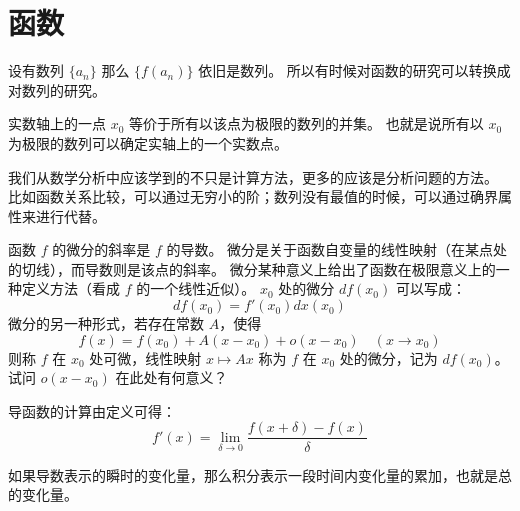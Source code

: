 
\section{函数}

\begin{exposition}
    设有数列 $\{a_n\}$ 那么 $\{f(a_n)\}$ 依旧是数列。
    所以有时候对函数的研究可以转换成对数列的研究。
\end{exposition}

\begin{exposition}
    实数轴上的一点 $x_0$ 等价于所有以该点为极限的数列的并集。
    也就是说所有以 $x_0$ 为极限的数列可以确定实轴上的一个实数点。
\end{exposition}

\begin{note}
    我们从数学分析中应该学到的不只是计算方法，更多的应该是分析问题的方法。
    比如函数关系比较，可以通过无穷小的阶；数列没有最值的时候，可以通过确界属性来进行代替。
\end{note}

\begin{note}
    函数 $f$ 的微分的斜率是 $f$ 的导数。
    微分是关于函数自变量的线性映射（在某点处的切线），而导数则是该点的斜率。
    微分某种意义上给出了函数在极限意义上的一种定义方法（看成 $f$ 的一个线性近似）。
    $x_0$ 处的微分 $df(x_0)$ 可以写成：
    \begin{equation*}
        df(x_0) = f'(x_0)dx(x_0)
    \end{equation*}
    微分的另一种形式，若存在常数 $A$，使得
    \begin{equation*}
        f(x) = f(x_0) + A(x-x_0) + o(x-x_0) \quad (x \to x_0)
    \end{equation*}
    则称 $f$ 在 $x_0$ 处可微，线性映射 $x \mapsto Ax$ 称为 $f$ 在 $x_0$ 处的微分，记为 $df(x_0)$。
    试问 $o(x - x_0)$ 在此处有何意义？
\end{note}

\begin{note}
    导函数的计算由定义可得：
    \begin{equation*}
        f'(x) = \lim_{\delta \to 0}{\frac{f(x+\delta) - f(x)}{\delta}}
    \end{equation*}
\end{note}

\begin{note}
    如果导数表示的瞬时的变化量，那么积分表示一段时间内变化量的累加，也就是总的变化量。
\end{note}

